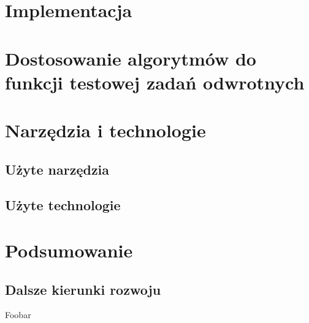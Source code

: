 \documentclass{report}
\begin{document}
	\chapter{Implementacja}

	\chapter{Dostosowanie algorytmów do funkcji testowej zadań odwrotnych}

	\chapter{Narzędzia i technologie}
		\section{Użyte narzędzia}

		\section{Użyte technologie}
	\chapter{Podsumowanie}
		\section{Dalsze kierunki rozwoju}
	Foobar
\end{document}
